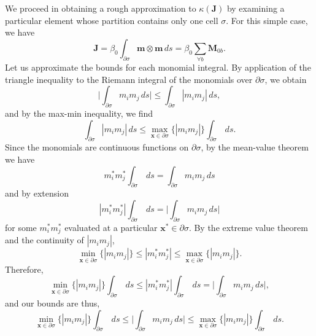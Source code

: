 We proceed in obtaining a rough approximation to $\kappa (\mathbf{J})$ by examining a particular element whose partition contains only one cell $\sigma$. For this simple case, we have
\begin{equation}
        \mathbf{J} = \beta_0 \int_{\partial \sigma} \mathbf{m} \otimes \mathbf{m} \, ds = \beta_0 \sum_{\forall b} \mathbf{M}_{0b}.
\end{equation}
Let us approximate the bounds for each monomial integral. By application of the triangle inequality to the Riemann integral of the monomials over $\partial \sigma$, we obtain
\begin{equation}
       \bigg| \int_{\partial \sigma} m_i m_j \, ds \bigg| \leq \int_{\partial \sigma} | m_i m_j | \, ds,
\end{equation}
and by the max-min inequality, we find
\begin{equation}
       \int_{\partial \sigma} | m_i m_j | \, ds \leq \max_{\mathbf{x} \in \partial \sigma} \{ | m_i m_j | \} \int_{\partial \sigma} \, ds.
\end{equation}
Since the monomials are continuous functions on $\partial \sigma$, by the mean-value theorem we have
\begin{equation}
        m^*_i m^*_j \int_{\partial \sigma} \, ds = \int_{\partial \sigma} m_i m_j \, ds
\end{equation}
and by extension
\begin{equation}
        | m^*_i m^*_j | \int_{\partial \sigma} \, ds = \bigg| \int_{\partial \sigma} m_i m_j \, ds \bigg|
\end{equation}
for some $m^*_i m^*_j$ evaluated at a particular $\mathbf{x}^* \in \partial \sigma$. By the extreme value theorem and the continuity of $|m_i m_j|$,
\begin{equation}
         \min_{\mathbf{x} \in \partial \sigma} \{ | m_i m_j | \} \leq | m^*_i m^*_j | \leq \max_{\mathbf{x} \in \partial \sigma} \{ | m_i m_j | \}.
\end{equation}
Therefore,
\begin{equation}
         \min_{\mathbf{x} \in \partial \sigma} \{ | m_i m_j | \} \int_{\partial \sigma} \, ds \leq | m^*_i m^*_j | \int_{\partial \sigma} \, ds = \bigg| \int_{\partial \sigma} m_i m_j \, ds \bigg|,
\end{equation}
and our bounds are thus,
\begin{equation}
       \min_{\mathbf{x} \in \partial \sigma} \{ | m_i m_j | \} \int_{\partial \sigma} \, ds \leq \bigg| \int_{\partial \sigma} m_i m_j \, ds \bigg| \leq \max_{\mathbf{x} \in \partial \sigma} \{ | m_i m_j | \} \int_{\partial \sigma} \, ds.
\end{equation}
